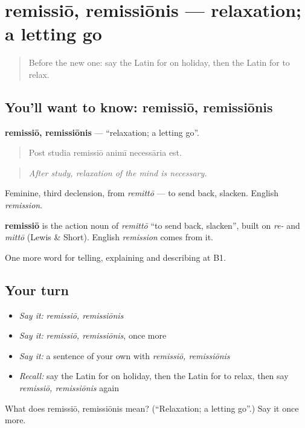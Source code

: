 \section[remissiō, remissiōnis]{remissiō, remissiōnis — relaxation; a letting go}

\label{lesson:LA-C538-remissio}



\begin{quote}
Before the new one: say the Latin for on holiday, then the Latin for to relax.
\end{quote}

\subsection*{You'll want to know: remissiō, remissiōnis}
\textbf{remissiō, remissiōnis} — \textquotedblleft{}relaxation; a letting go\textquotedblright{}.

\begin{quote}
Post studia remissiō animī necessāria est.
\end{quote}

\begin{quote}
\emph{After study, relaxation of the mind is necessary.}
\end{quote}

Feminine, third declension, from \emph{remittō} — to send back, slacken. English \emph{remission}.

\begin{cousinweb}
\textbf{remissiō} is the action noun of \emph{remittō} \textquotedblleft{}to send back, slacken\textquotedblright{}, built on \emph{re-} and \emph{mittō} (Lewis \& Short). English \emph{remission} comes from it.
\end{cousinweb}

\begin{grammarlens}[title={What you've built}]
One more word for telling, explaining and describing at B1.
\end{grammarlens}

\subsection*{Your turn}
\begin{itemize}
\raggedright
  \item \emph{Say it:} \emph{remissiō, remissiōnis}
  \item \emph{Say it:} \emph{remissiō, remissiōnis}, once more
  \item \emph{Say it:} a sentence of your own with \emph{remissiō, remissiōnis}
  \item \emph{Recall:} say the Latin for on holiday, then the Latin for to relax, then say \emph{remissiō, remissiōnis} again
\end{itemize}

\begin{tcolorbox}[breakable,colback=teal!4,colframe=teal!35!black,title={Before you move on}]
What does remissiō, remissiōnis mean? (\textquotedblleft{}Relaxation; a letting go\textquotedblright{}.) Say it once more.
\end{tcolorbox}
